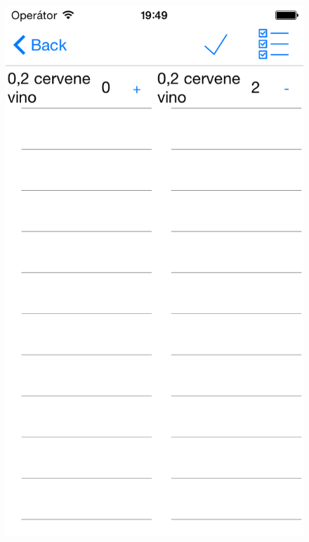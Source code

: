\begin{figure}[h]
\begin{minipage}{.5\textwidth}
  \label{fig:moveorderspage1}
\end{minipage}%
\begin{minipage}{.5\textwidth}
  \centering
  \includegraphics[width=.95\textwidth]{move2.png}
  \label{fig:moveorderspage2}
\end{minipage}
\end{figure}

